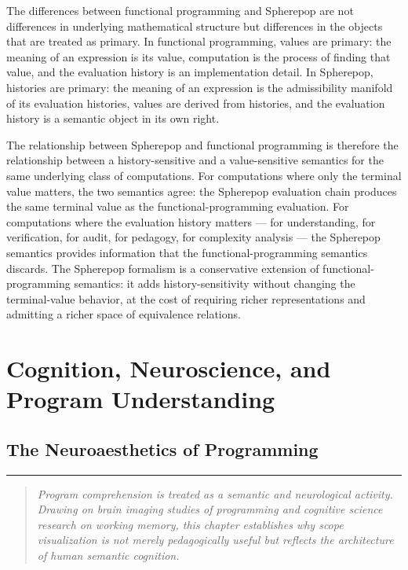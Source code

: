 \documentclass[12pt,openany]{book}
\theoremstyle{plain}
\theoremstyle{definition}
\theoremstyle{remark}
\newcommand{\chapterrule}{%
  \vspace{4pt}%
  {\color{SpherepopBlue}\rule{\textwidth}{0.8pt}}%
  \vspace{10pt}%
}
\newenvironment{chapterprecis}{%
  \begin{quote}\small\itshape}{%
  \end{quote}\medskip}
\begin{document}
The differences between functional programming and Spherepop are not differences in underlying mathematical structure but differences in the objects that are treated as primary. In functional programming, values are primary: the meaning of an expression is its value, computation is the process of finding that value, and the evaluation history is an implementation detail. In Spherepop, histories are primary: the meaning of an expression is the admissibility manifold of its evaluation histories, values are derived from histories, and the evaluation history is a semantic object in its own right.

The relationship between Spherepop and functional programming is therefore the relationship between a history-sensitive and a value-sensitive semantics for the same underlying class of computations. For computations where only the terminal value matters, the two semantics agree: the Spherepop evaluation chain produces the same terminal value as the functional-programming evaluation. For computations where the evaluation history matters — for understanding, for verification, for audit, for pedagogy, for complexity analysis — the Spherepop semantics provides information that the functional-programming semantics discards. The Spherepop formalism is a conservative extension of functional-programming semantics: it adds history-sensitivity without changing the terminal-value behavior, at the cost of requiring richer representations and admitting a richer space of equivalence relations.

 \clearpage

\part{Cognition, Neuroscience, and Program Understanding}

\chapter{The Neuroaesthetics of Programming}
\chapterrule

\begin{chapterprecis}
Program comprehension is treated as a semantic and neurological
activity. Drawing on brain imaging studies of programming and
cognitive science research on working memory, this chapter
establishes why scope visualization is not merely pedagogically
useful but reflects the architecture of human semantic cognition.
\end{chapterprecis}
\end{document}
